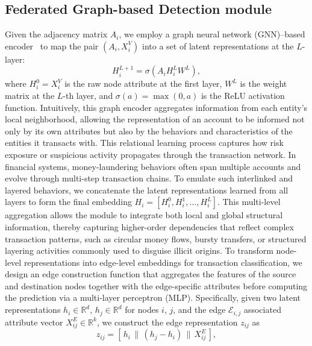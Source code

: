 \subsection{Federated Graph-based Detection module}
\label{sec:detection_model}
Given the adjacency matrix $A_i$, we employ a graph neural network (GNN)–based encoder~\parencite{kipf2016semi, DBLP:conf/iclr/XuHLJ19} to map the pair $(A_i, X_i^V)$ into a set of latent representations at the $L$-layer:
\begin{equation}
    H_i^{L+1} = \sigma(A_i H_i^L W^L),
\end{equation}
where $H_i^0=X_i^V$ is the raw node attribute at the first layer, $W^L$ is the weight matrix at the $L$-th layer, and $\sigma(a)=\max(0,a)$ is the ReLU activation function. Intuitively, this graph encoder aggregates information from each entity’s local neighborhood, allowing the representation of an account to be informed not only by its own attributes but also by the behaviors and characteristics of the entities it transacts with. This relational learning process captures how risk exposure or suspicious activity propagates through the transaction network. In financial systems, money-laundering behaviors often span multiple accounts and evolve through multi-step transaction chains. To emulate such interlinked and layered behaviors, we concatenate the latent representations learned from all layers to form the final embedding $H_i = [H_i^0, H_i^1, \ldots, H_i^L]$. This multi-level aggregation allows the module to integrate both local and global structural information, thereby capturing higher-order dependencies that reflect complex transaction patterns, such as circular money flows, bursty transfers, or structured layering activities commonly used to disguise illicit origins. 
To transform node-level representations into edge-level embeddings for transaction classification, we design an edge construction function that aggregates the features of the source and destination nodes together with the edge-specific attributes before computing the prediction via a multi-layer perceptron (MLP). Specifically, given two latent representations $h_i \in \mathbb{R}^d$, $h_j \in \mathbb{R}^d$ for nodes $i$, $j$, and the edge $\mathcal{E}_{i,j}$ associated attribute vector $X^E_{ij} \in \mathbb{R}^k$, we construct the edge representation $z_{ij}$ as
\begin{equation}
    z_{ij} = \left[\, h_i \,\|\, (h_j - h_i) \,\|\, X^E_{ij} \,\right],
\end{equation}
